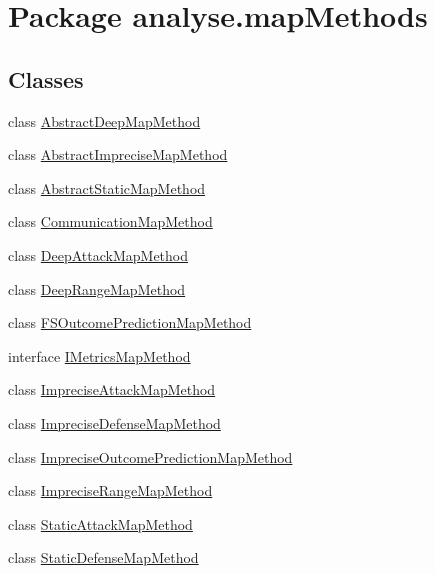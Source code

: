 \hypertarget{namespaceanalyse_1_1map_methods}{}\section{Package analyse.\+map\+Methods}
\label{namespaceanalyse_1_1map_methods}
\subsection*{Classes}
\begin{DoxyCompactItemize}
\item 
class \mbox{\hyperlink{classanalyse_1_1map_methods_1_1_abstract_deep_map_method}{Abstract\+Deep\+Map\+Method}}
\item 
class \mbox{\hyperlink{classanalyse_1_1map_methods_1_1_abstract_imprecise_map_method}{Abstract\+Imprecise\+Map\+Method}}
\item 
class \mbox{\hyperlink{classanalyse_1_1map_methods_1_1_abstract_static_map_method}{Abstract\+Static\+Map\+Method}}
\item 
class \mbox{\hyperlink{classanalyse_1_1map_methods_1_1_communication_map_method}{Communication\+Map\+Method}}
\item 
class \mbox{\hyperlink{classanalyse_1_1map_methods_1_1_deep_attack_map_method}{Deep\+Attack\+Map\+Method}}
\item 
class \mbox{\hyperlink{classanalyse_1_1map_methods_1_1_deep_range_map_method}{Deep\+Range\+Map\+Method}}
\item 
class \mbox{\hyperlink{classanalyse_1_1map_methods_1_1_f_s_outcome_prediction_map_method}{F\+S\+Outcome\+Prediction\+Map\+Method}}
\item 
interface \mbox{\hyperlink{interfaceanalyse_1_1map_methods_1_1_i_metrics_map_method}{I\+Metrics\+Map\+Method}}
\item 
class \mbox{\hyperlink{classanalyse_1_1map_methods_1_1_imprecise_attack_map_method}{Imprecise\+Attack\+Map\+Method}}
\item 
class \mbox{\hyperlink{classanalyse_1_1map_methods_1_1_imprecise_defense_map_method}{Imprecise\+Defense\+Map\+Method}}
\item 
class \mbox{\hyperlink{classanalyse_1_1map_methods_1_1_imprecise_outcome_prediction_map_method}{Imprecise\+Outcome\+Prediction\+Map\+Method}}
\item 
class \mbox{\hyperlink{classanalyse_1_1map_methods_1_1_imprecise_range_map_method}{Imprecise\+Range\+Map\+Method}}
\item 
class \mbox{\hyperlink{classanalyse_1_1map_methods_1_1_static_attack_map_method}{Static\+Attack\+Map\+Method}}
\item 
class \mbox{\hyperlink{classanalyse_1_1map_methods_1_1_static_defense_map_method}{Static\+Defense\+Map\+Method}}
\end{DoxyCompactItemize}
